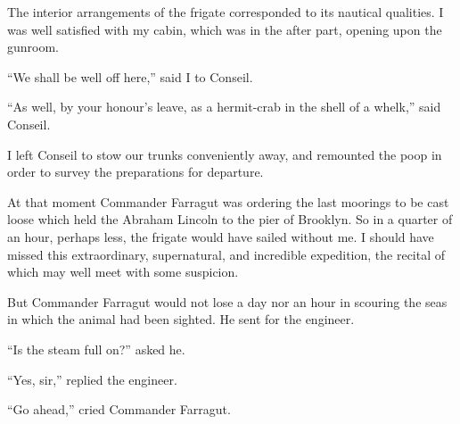 The interior arrangements of the frigate corresponded to its
nautical qualities.  I was well satisfied with my cabin,
which was in the after part, opening upon the gunroom.

``We shall be well off here,'' said I to Conseil.

``As well, by your honour's leave, as a hermit-crab in the shell
of a whelk,'' said Conseil.

I left Conseil to stow our trunks conveniently away, and remounted
the poop in order to survey the preparations for departure.

At that moment Commander Farragut was ordering the last moorings
to be cast loose which held the Abraham Lincoln to the pier
of Brooklyn.  So in a quarter of an hour, perhaps less,
the frigate would have sailed without me.  I should have missed
this extraordinary, supernatural, and incredible expedition,
the recital of which may well meet with some suspicion.

But Commander Farragut would not lose a day nor an hour
in scouring the seas in which the animal had been sighted.
He sent for the engineer.

``Is the steam full on?'' asked he.

``Yes, sir,'' replied the engineer.

``Go ahead,'' cried Commander Farragut.
